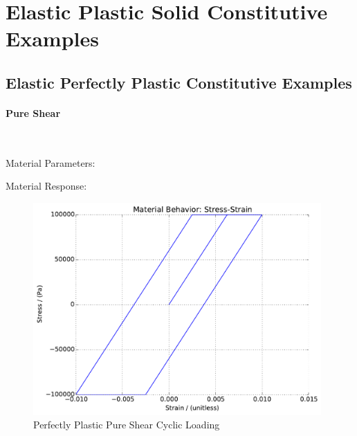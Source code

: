 \documentclass[fleqn,11pt]{article}
\begin{document}
\newpage
\section{Elastic Plastic Solid Constitutive Examples}
\label{section_elastoplastic_constitutive_example}
\subsection{Elastic Perfectly Plastic Constitutive Examples}


\paragraph{Pure Shear} ~

Material Parameters:


Material Response:
\begin{figure}[H]
\begin{center}
\includegraphics[width=11cm]{../fei_examples/perfectly_plastic/2pure_shear_cyclic_loading/result.pdf}
\caption{
\label{Perfectly Plastic Pure Shear Cyclic}
Perfectly Plastic Pure Shear Cyclic Loading}
\end{center}
\end{figure}
\end{document}
